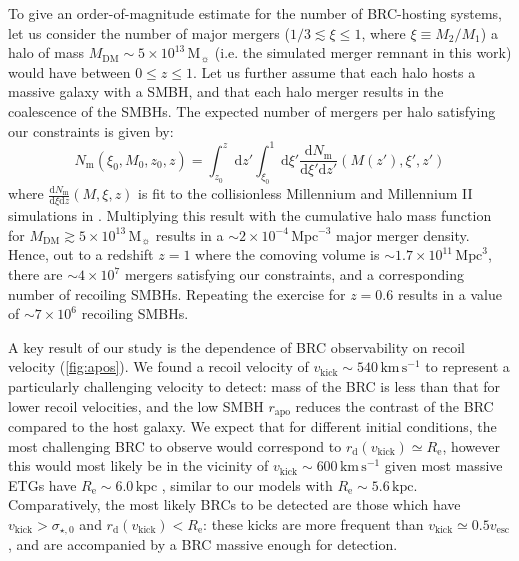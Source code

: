 \documentclass[twocolumn]{aastex631}
\newcommand{\Msun}{\ensuremath{\mathrm{M}_{\sun}}}            %
\newcommand{\kmps}{\ensuremath{\mathrm{km}\,\mathrm{s}^{-1}} }%
\newcommand{\Reff}{\ensuremath{R_\mathrm{e}}}                 %
\newcommand{\rapo}{\ensuremath{r_\mathrm{apo}}}               %
\newcommand{\vk}{\ensuremath{v_\mathrm{kick}}}                %
\newcommand{\sigcore}{\ensuremath{\sigma_{\star,0}}}          %
\newcommand{\rdetect}{\ensuremath{r_\mathrm{d}(\vk)}}         %
\newcommand{\dd}[1]{\ensuremath{\mathrm{d}#1}}                %
\newcommand{\dv}[2]{\ensuremath{\frac{\dd{#1}}{\dd{#2}}}}     %
\begin{document}
To give an order-of-magnitude estimate for the number of BRC-hosting systems, let us consider the number of major mergers ($1/3\lesssim \xi \leq 1$, where $\xi\equiv M_2/M_1$) a halo of mass $M_\mathrm{DM}\sim 5\times10^{13}\,\Msun$ (i.e. the simulated merger remnant in this work) would have between $0\leq z \leq 1$.
Let us further assume that each halo hosts a massive galaxy with a SMBH, and that each halo merger results in the coalescence of the SMBHs.
The expected number of mergers per halo satisfying our constraints is given by:
\begin{equation}
    N_\mathrm{m}(\xi_0, M_0, z_0, z) = \int_{z_0}^{z} \dd{z'} \int_{\xi_0}^1 \dd{\xi'} \dv{N_\mathrm{m}}{\xi'\dd{z'}}\left( M(z'),\xi',z' \right)
\end{equation}
where $\dv{N_\mathrm{m}}{\xi\dd{z}}(M,\xi,z)$ is fit to the collisionless Millennium and Millennium II simulations in \citet{fakhouri2010}.
Multiplying this result with the cumulative halo mass function for $M_\mathrm{DM}\gtrsim 5\times10^{13}\,\Msun$ \citep[e.g.][]{rodriguezpuebla2016} results in a $\sim 2\times10^{-4}\,\mathrm{Mpc}^{-3}$ major merger density.
Hence, out to a redshift $z=1$ where the comoving volume is $\sim1.7\times10^{11}\,\mathrm{Mpc}^3$, there are $\sim4\times10^7$ mergers satisfying our constraints, and a corresponding number of recoiling SMBHs.
Repeating the exercise for $z=0.6$ results in a value of $\sim 7\times10^6$ recoiling SMBHs.

A key result of our study is the dependence of BRC observability on recoil velocity (\autoref{fig:apos}).
We found a recoil velocity of $\vk\sim 540\,\kmps$ to represent a particularly challenging velocity to detect: mass of the BRC is less than that for lower recoil velocities, and the low SMBH $\rapo$ reduces the contrast of the BRC compared to the host galaxy.
We expect that for different initial conditions, the most challenging BRC to observe would correspond to $\rdetect\simeq \Reff$, however this would most likely be in the vicinity of $\vk\sim600\,\kmps$ given most massive ETGs have $\Reff\sim6.0\,\mathrm{kpc}$ \citep[e.g.][]{kelvin2012}, similar to our models with $\Reff\sim5.6\,\mathrm{kpc}$.
Comparatively, the most likely BRCs to be detected are those which have $\vk>\sigcore$ and $\rdetect < \Reff$: these kicks are more frequent than $\vk \simeq 0.5v_\mathrm{esc}$, and are accompanied by a BRC massive enough for detection.
\end{document}
